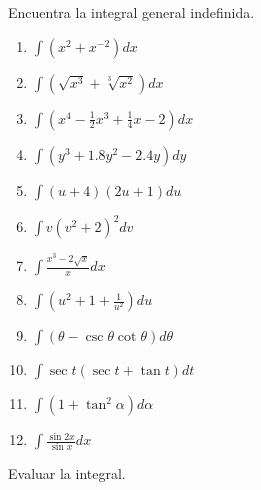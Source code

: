\documentclass[12pt,]{article}
\begin{document}
Encuentra la integral general indefinida.

\begin{enumerate}
\def\labelenumi{\arabic{enumi}.}
\setcounter{enumi}{4}
\item
  \(\displaystyle\int(x^2+x^{-2})dx\)
\item
  \(\displaystyle\int(\sqrt{x^3}+\sqrt[3]{x^2})dx\)
\item
  \(\displaystyle\int(x^4-\frac{1}{2}x^3+\frac{1}{4}x-2)dx\)
\item
  \(\displaystyle\int(y^3+1.8y^2-2.4y)dy\)
\item
  \(\displaystyle\int(u+4)(2u+1)du\)
\item
  \(\displaystyle\int v(v^2+2)^2dv\)
\item
  \(\displaystyle\int\frac{x^3-2\sqrt{x}}{x}dx\)
\item
  \(\displaystyle\int\left(u^2+1+\frac{1}{u^2}\right)du\)
\item
  \(\displaystyle\int(\theta-\csc\theta\cot\theta)d\theta\)
\item
  \(\displaystyle\int\sec t(\sec t+\tan t)dt\)
\item
  \(\displaystyle\int(1+\tan^2\alpha)d\alpha\)
\item
  \(\displaystyle\int\frac{\sin2x}{\sin x}dx\)
\end{enumerate}

Evaluar la integral.
\end{document}
